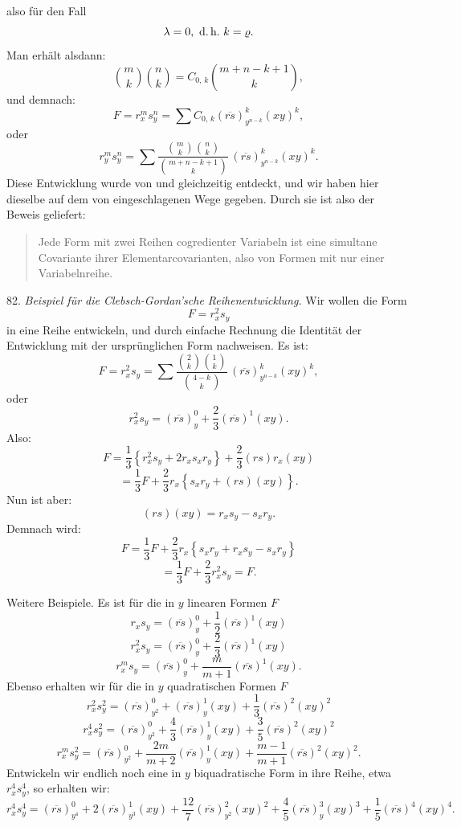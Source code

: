 \documentclass[11pt]{article}
\providecommand{\gesperrt}[1]{\textls[130]{#1}}
\providecommand{\weberpage}[1]{}
\providecommand{\weq}[2]{\begin{equation}\tag{#1}#2\end{equation}}
\begin{document}
\weberpage{86}
also für den Fall
\[
\lambda=0,\ \text{d.\,h.}\ k=\varrho.
\]
Man erhält alsdann:
\[
\binom{m}{k}\binom{n}{k}=C_{0,\,k}\binom{m+n-k+1}{k},
\]
und demnach:
\[
F=r_x^m s_y^n=\sum C_{0,\,k}(\overline{rs})^k_{y^{n-k}}(xy)^k,
\]
oder
\weq{VIII}{r_y^m s_y^n=\sum \frac{\binom{m}{k}\binom{n}{k}}{\binom{m+n-k+1}{k}}\,(\overline{rs})^k_{y^{n-k}}(xy)^k.} %
Diese Entwicklung wurde von \gesperrt{Clebsch} und \gesperrt{Gordan} gleichzeitig entdeckt, und wir haben hier dieselbe auf dem von \gesperrt{Clebsch} eingeschlagenen Wege gegeben. Durch sie ist also der Beweis geliefert:

\begin{quote}
\glqq Jede Form mit zwei Reihen cogredienter Variabeln ist eine simultane Covariante ihrer Elementarcovarianten, also von Formen mit nur einer Variabelnreihe.\grqq{}
\end{quote}

82. \textit{Beispiel für die Clebsch-Gordan'sche Reihenentwicklung.} Wir wollen die Form
\[
F=r_x^2 s_y
\]
in eine Reihe entwickeln, und durch einfache Rechnung die Identität der Entwicklung mit der ursprünglichen Form nachweisen. Es ist:
\[
F=r_x^2 s_y=\sum \frac{\binom{2}{k}\binom{1}{k}}{\binom{4-k}{k}}\,(\overline{rs})^k_{y^{n-k}}(xy)^k,
\]
oder
\[
r_x^2 s_y=(\overline{rs})^0_y+\frac{2}{3}(\overline{rs})^1(xy).
\]
Also:
\[
F=\frac{1}{3}\left\{r_x^2 s_y+2r_x s_x r_y\right\}+\frac{2}{3}(rs)r_x(xy)
\]
\[
=\frac{1}{3}F+\frac{2}{3}r_x\left\{s_x r_y+(rs)(xy)\right\}.
\]
Nun ist aber:
\[
(rs)(xy)=r_x s_y - s_x r_y.
\]
Demnach wird:
\[
F=\frac{1}{3}F+\frac{2}{3}r_x\left\{s_x r_y+r_x s_y-s_x r_y\right\}
\]
\[
=\frac{1}{3}F+\frac{2}{3}r_x^2 s_y=F.
\]


\weberpage{87}
Weitere Beispiele. Es ist für die in $y$ linearen Formen $F$
\[
r_x s_y=(\overline{rs})^0_y+\frac{1}{2}(\overline{rs})^1(xy)
\]
\[
r_x^2 s_y=(\overline{rs})^0_y+\frac{2}{3}(\overline{rs})^1(xy)
\]
\[
r_x^m s_y=(\overline{rs})^0_y+\frac{m}{m+1}(\overline{rs})^1(xy).
\]
Ebenso erhalten wir für die in $y$ quadratischen Formen $F$
\[
r_x^2 s_y^2=(\overline{rs})^0_{y^2}+(\overline{rs})^1_y(xy)+\frac{1}{3}(\overline{rs})^2(xy)^2
\]
\[
r_x^4 s_y^2=(\overline{rs})^0_{y^2}+\frac{4}{3}(\overline{rs})^1_y(xy)+\frac{3}{5}(\overline{rs})^2(xy)^2
\]
\[
r_x^m s_y^2=(\overline{rs})^0_{y^2}+\frac{2m}{m+2}(\overline{rs})^1_y(xy)+\frac{m-1}{m+1}(\overline{rs})^2(xy)^2.
\]
Entwickeln wir endlich noch eine in $y$ biquadratische Form in ihre Reihe, etwa $r_x^4 s_y^4$, so erhalten wir:
\[
r_x^4 s_y^4=(\overline{rs})^0_{y^4}+2(\overline{rs})^1_{y^3}(xy)+\frac{12}{7}(\overline{rs})^2_{y^2}(xy)^2+\frac{4}{5}(\overline{rs})^3_y(xy)^3+\frac{1}{5}(\overline{rs})^4(xy)^4.
\]
\end{document}

